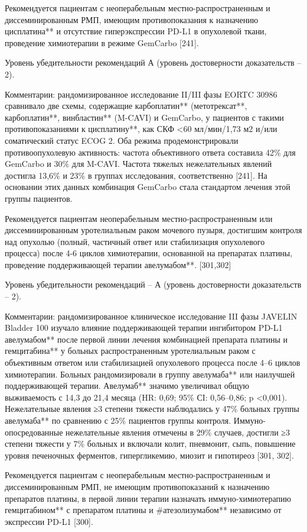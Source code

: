 Рекомендуется пациентам с неоперабельным местно-распространенным и диссеминированным РМП, имеющим противопоказания к назначению цисплатина** и отсутствие гиперэкспрессии PD-L1 в опухолевой ткани, проведение химиотерапии в режиме GemCarbo [241].

Уровень убедительности рекомендаций А (уровень достоверности доказательств – 2).

Комментарии: рандомизированное исследование II/III фазы EORTC 30986 сравнивало две схемы, содержащие карбоплатин** (метотрексат**, карбоплатин**, винбластин** (M-CAVI) и GemCarbo, у пациентов с такими противопоказаниями к цисплатину**, как СКФ <60 мл/мин/1,73 м2 и/или соматический статус ECOG 2. Оба режима продемонстрировали противоопухолевую активность: частота объективного ответа составила 42\% для GemCarbo и 30\% для M-CAVI. Частота тяжелых нежелательных явлений достигла 13,6\% и 23\% в группах исследования, соответственно [241]. На основании этих данных комбинация GemCarbo стала стандартом лечения этой группы пациентов.

Рекомендуется пациентам неоперабельным местно-распространенным или диссеминированным уротелиальным раком мочевого пузыря, достигшим контроля над опухолью (полный, частичный ответ или стабилизация опухолевого процесса) после 4-6 циклов химиотерапии, основанной на препаратах платины, проведение поддерживающей терапии авелумабом**. [301,302]

Уровень убедительности рекомендаций – А (уровень достоверности доказательств – 2).

Комментарии: рандомизированное клиническое исследование III фазы JAVELIN Bladder 100 изучало влияние поддерживающей терапии ингибитором PD-L1 авелумабом** после первой линии лечения комбинацией препарата платины и гемцитабина** у больных распространенным уротелиальным раком с объективным ответом или стабилизацией опухолевого процесса после 4–6 циклов химиотерапии.  Больных рандомизировали в группу авелумаба** или наилучшей поддерживающей терапии. Авелумаб** значимо увеличивал общую выживаемость с 14,3 до 21,4 месяца (HR: 0,69; 95\% СI: 0,56–0,86; p <0,001). Нежелательные явления ≥3 степени тяжести наблюдались у 47\% больных группы авелумаба** по сравнению с 25\% пациентов группы контроля. Иммуно-опосредованные нежелательные явления отмечены в 29\% случаев, достигли ≥3 степени тяжести у 7\% больных и включали колит, пневмонит, сыпь, повышение уровня печеночных ферментов, гипергликемию, миозит и гипотиреоз [301, 302].

Рекомендуется пациентам с неоперабельным местно-распространенным и диссеминированным РМП, не имеющим противопоказаний к назначению препаратов платины, в первой линии терапии назначать иммуно-химиотерапию гемцитабином** с препаратом платины и #атезолизумабом** независимо от экспрессии PD-L1 [300].

